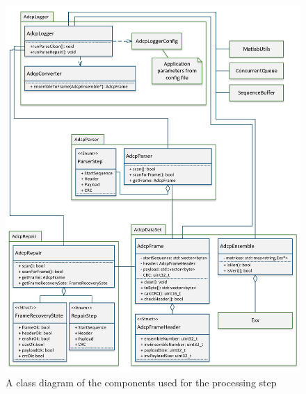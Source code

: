 \begin{figure}[!ht]
\centering
      \includegraphics[width=1.05\textwidth]{logger_class}
        \caption{A class diagram of the components used for the processing step}
\end{figure}
\vspace{4em}

